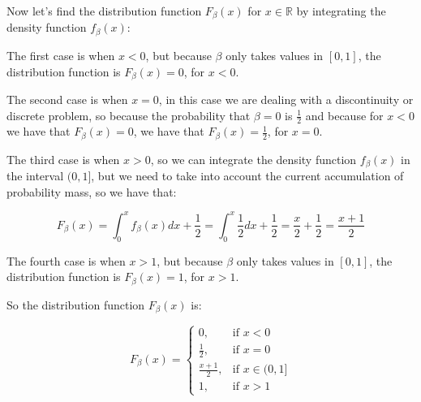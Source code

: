 Now let's find the distribution function $F_\beta(x)$ for $x \in \mathbb{R}$ by integrating the density function $f_\beta(x)$:

The first case is when $x < 0$, but because $\beta$ only takes values in $[0, 1]$, the distribution function is $F_\beta(x) = 0$, for $x < 0$.

The second case is when $x = 0$, in this case we are dealing with a discontinuity or discrete problem, so because
the probability that $\beta = 0$ is $\frac{1}{2}$ and because for $x < 0$ we have that $F_\beta(x) = 0$, we have that
$F_\beta(x) = \frac{1}{2}$, for $x = 0$.

The third case is when $x > 0$, so we can integrate the density function $f_\beta(x)$ in the interval $(0, 1]$, but
we need to take into account the current accumulation of probability mass, so we have that:

\begin{equation}
    F_\beta(x) = \int_{0}^{x} f_\beta(x) dx + \frac{1}{2} = \int_{0}^{x} \frac{1}{2} dx  + \frac{1}{2} = \frac{x}{2} + \frac{1}{2} = \frac{x + 1}{2}
\end{equation}

The fourth case is when $x > 1$, but because $\beta$ only takes values in $[0, 1]$, the distribution function is $F_\beta(x) = 1$, for $x > 1$.

So the distribution function $F_\beta(x)$ is:

\begin{equation}
    F_\beta(x) = \begin{cases}
        0,               & \text{if } x < 0        \\
        \frac{1}{2},     & \text{if } x = 0        \\
        \frac{x + 1}{2}, & \text{if } x \in (0, 1] \\
        1,               & \text{if } x > 1
    \end{cases}
\end{equation}